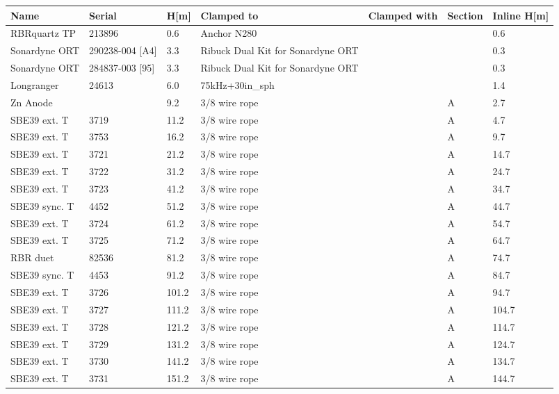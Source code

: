 \documentclass{article}
\begin{document}
\begin{tabularx}{\linewidth}{|l|l|l|X|l|l|l|}
\caption{N280 \textcolor{red}{$\blacksquare$}: Clamp-on summary}\\
\hline
\textbf{Name} & \textbf{Serial} & \textbf{H[m]} & \textbf{Clamped to} & \textbf{Clamped with} & \textbf{Section} & \textbf{Inline H[m]} \\
\hline
RBRquartz TP & 213896 & 0.6 & Anchor N280 &  &  & 0.6 \\ \hline
Sonardyne ORT & 290238-004 [A4] & 3.3 & Ribuck Dual Kit for Sonardyne ORT &  &  & 0.3 \\ \hline
Sonardyne ORT & 284837-003 [95] & 3.3 & Ribuck Dual Kit for Sonardyne ORT &  &  & 0.3 \\ \hline
Longranger & 24613 & 6.0 & 75kHz+30in\_sph &  &  & 1.4 \\ \hline
Zn Anode &  & 9.2 & 3/8 wire rope &  & A & 2.7 \\ \hline
SBE39 ext. T & 3719 & 11.2 & 3/8 wire rope &  & A & 4.7 \\ \hline
SBE39 ext. T & 3753 & 16.2 & 3/8 wire rope &  & A & 9.7 \\ \hline
SBE39 ext. T & 3721 & 21.2 & 3/8 wire rope &  & A & 14.7 \\ \hline
SBE39 ext. T & 3722 & 31.2 & 3/8 wire rope &  & A & 24.7 \\ \hline
SBE39 ext. T & 3723 & 41.2 & 3/8 wire rope &  & A & 34.7 \\ \hline
SBE39 sync. T & 4452 & 51.2 & 3/8 wire rope &  & A & 44.7 \\ \hline
SBE39 ext. T & 3724 & 61.2 & 3/8 wire rope &  & A & 54.7 \\ \hline
SBE39 ext. T & 3725 & 71.2 & 3/8 wire rope &  & A & 64.7 \\ \hline
RBR duet & 82536 & 81.2 & 3/8 wire rope &  & A & 74.7 \\ \hline
SBE39 sync. T & 4453 & 91.2 & 3/8 wire rope &  & A & 84.7 \\ \hline
SBE39 ext. T & 3726 & 101.2 & 3/8 wire rope &  & A & 94.7 \\ \hline
SBE39 ext. T & 3727 & 111.2 & 3/8 wire rope &  & A & 104.7 \\ \hline
SBE39 ext. T & 3728 & 121.2 & 3/8 wire rope &  & A & 114.7 \\ \hline
SBE39 ext. T & 3729 & 131.2 & 3/8 wire rope &  & A & 124.7 \\ \hline
SBE39 ext. T & 3730 & 141.2 & 3/8 wire rope &  & A & 134.7 \\ \hline
SBE39 ext. T & 3731 & 151.2 & 3/8 wire rope &  & A & 144.7 \\ \hline

\end{tabularx}
\end{document}
